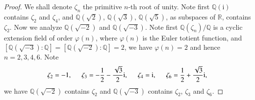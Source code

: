 \begin{proof}
We shall denote $\zeta_n$ the primitive $n$-th root of unity. Note first $\mathbb{Q}(\mathrm{i})$ contains $\zeta_2$ and $\zeta_4$, and $\mathbb{Q}(\sqrt{2})$, $\mathbb{Q}(\sqrt{3})$, $\mathbb{Q}(\sqrt{5})$, as subspaces of $\mathbb{R}$, contains $\zeta_2$. Now we analyze $\mathbb{Q}(\sqrt{-2})$ and $\mathbb{Q}(\sqrt{-3})$. Note first $\mathbb{Q}(\zeta_n)/\mathbb{Q}$ is a cyclic extension field of order $\varphi(n)$, where $\varphi(n)$ is the Euler totient function, and $[\mathbb{Q}(\sqrt{-3}):\mathbb{Q}]=[\mathbb{Q}(\sqrt{-2}):\mathbb{Q}]=2$, we have $\varphi(n)=2$ and hence $n=2,3,4,6$. Note 
$$
\zeta _2=-1,\hspace{0.5cm}\zeta _3=-\frac{1}{2}-\frac{\sqrt{3}}{2}\mathrm{i},\hspace{0.5cm}\zeta _4=\mathrm{i},\hspace{0.5cm}\zeta _6=\frac{1}{2}+\frac{\sqrt{3}}{2}\mathrm{i},
$$
we have $\mathbb{Q}(\sqrt{-2})$ contains $\zeta_2$ and $\mathbb{Q}(\sqrt{-3})$ contains $\zeta_2$, $\zeta_3$ and $\zeta_6$.
\end{proof}
